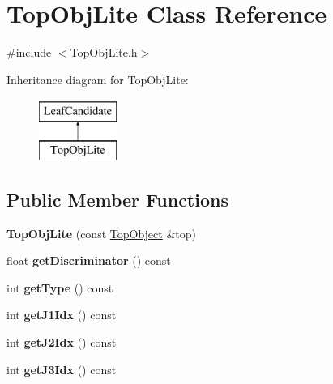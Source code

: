 \hypertarget{classTopObjLite}{\section{Top\-Obj\-Lite Class Reference}
\label{classTopObjLite}
}


{\ttfamily \#include $<$Top\-Obj\-Lite.\-h$>$}

Inheritance diagram for Top\-Obj\-Lite\-:\begin{figure}[H]
\begin{center}
\leavevmode
\includegraphics[height=2.000000cm]{classTopObjLite}
\end{center}
\end{figure}
\subsection*{Public Member Functions}
\begin{DoxyCompactItemize}
\item 
\hypertarget{classTopObjLite_a1cf0c97f077cbb9155d0de9a9d4df4b9}{{\bfseries Top\-Obj\-Lite} (const \hyperlink{classTopObject}{Top\-Object} \&top)}\label{classTopObjLite_a1cf0c97f077cbb9155d0de9a9d4df4b9}

\item 
\hypertarget{classTopObjLite_a9e634371b0ae7954bc946ecbff14e754}{float {\bfseries get\-Discriminator} () const }\label{classTopObjLite_a9e634371b0ae7954bc946ecbff14e754}

\item 
\hypertarget{classTopObjLite_aa360e450bcd7dff271051bb28c1ed415}{int {\bfseries get\-Type} () const }\label{classTopObjLite_aa360e450bcd7dff271051bb28c1ed415}

\item 
\hypertarget{classTopObjLite_ae370054eafb907b958fb5856a6fc54e9}{int {\bfseries get\-J1\-Idx} () const }\label{classTopObjLite_ae370054eafb907b958fb5856a6fc54e9}

\item 
\hypertarget{classTopObjLite_aae4eed76d9d315bc6a78b13d47ac63b4}{int {\bfseries get\-J2\-Idx} () const }\label{classTopObjLite_aae4eed76d9d315bc6a78b13d47ac63b4}

\item 
\hypertarget{classTopObjLite_a421262844777ac8907942bec45b12d88}{int {\bfseries get\-J3\-Idx} () const }\label{classTopObjLite_a421262844777ac8907942bec45b12d88}

\end{DoxyCompactItemize}



